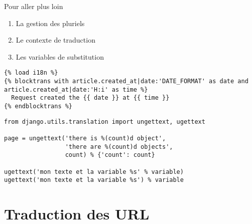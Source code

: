 \documentclass{beamer}
\begin{document}
\begin{frame}[fragile]
  \begin{alertblock}{Pour aller plus loin}
    \begin{enumerate}
      \pause \item La gestion des pluriels
      \pause \item Le contexte de traduction
      \pause \item Les variables de substitution
    \end{enumerate}
  \end{alertblock}
  \pause

  \begin{lstlisting}
{% load i18n %}
{% blocktrans with article.created_at|date:'DATE_FORMAT' as date and article.created_at|date:'H:i' as time %}
  Request created the {{ date }} at {{ time }}
{% endblocktrans %}
  \end{lstlisting}
\pause

  \begin{lstlisting}
from django.utils.translation import ungettext, ugettext

page = ungettext('there is %(count)d object',
                 'there are %(count)d objects',
                 count) % {'count': count}

ugettext('mon texte et la variable %s' % variable)
ugettext('mon texte et la variable %s') % variable
  \end{lstlisting}

\end{frame}

\section{Traduction des URL}
\end{document}
